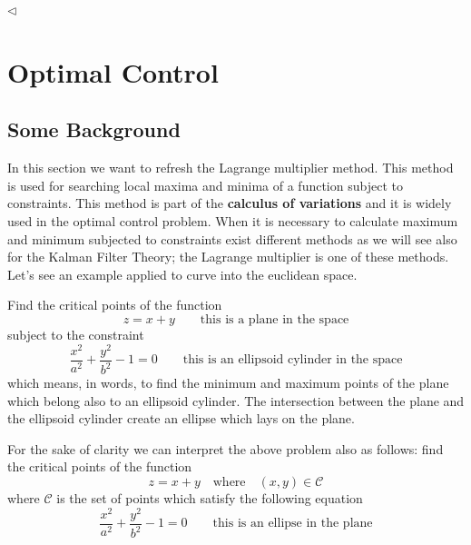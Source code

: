 \documentclass[12pt,a4paper,oneside]{book}
\begin{document}
\begin{onehalfspace}
\begin{example}
	$\triangleleft$
\end{example}

\chapter{Optimal Control}
\section{Some Background}
In this section we want to refresh the Lagrange multiplier method. This method 
is used for searching local maxima and minima of a function subject to 
constraints. This method is part of the \textbf{calculus of variations} and it 
is widely used in the optimal control problem. When it is necessary to 
calculate maximum and minimum subjected to constraints exist different methods 
as we will see also for the Kalman Filter Theory; the Lagrange multiplier is 
one of these methods. Let's see an example applied to curve into the euclidean 
space.

\begin{example}
	Find the critical points of the function 
	\begin{equation}
		z=x+y\qquad\text{this is a plane in the space}
	\end{equation}
	subject to the constraint 
	\begin{equation}
		\frac{x^2}{a^2}+\frac{y^2}{b^2}-1=0 \qquad\text{this is an ellipsoid cylinder in the space}
	\end{equation}
	which means, in words, to find the minimum and maximum points of the plane 
	which belong also to an ellipsoid cylinder. The intersection between the plane 
	and the ellipsoid cylinder create an ellipse which lays on the plane.
	
	For the sake of clarity we can interpret the above problem also as follows: find the critical points of the function 
	\begin{equation}
		z=x+y\quad\text{where}\quad (x,y)\in\mathscr{C}
	\end{equation}
	where $\mathscr{C}$ is the set of points which satisfy the following equation
	\begin{equation}
		\frac{x^2}{a^2}+\frac{y^2}{b^2}-1=0 \qquad\text{this is an ellipse in the plane}
	\end{equation}
	

\end{example}
\end{onehalfspace}
\end{document}
